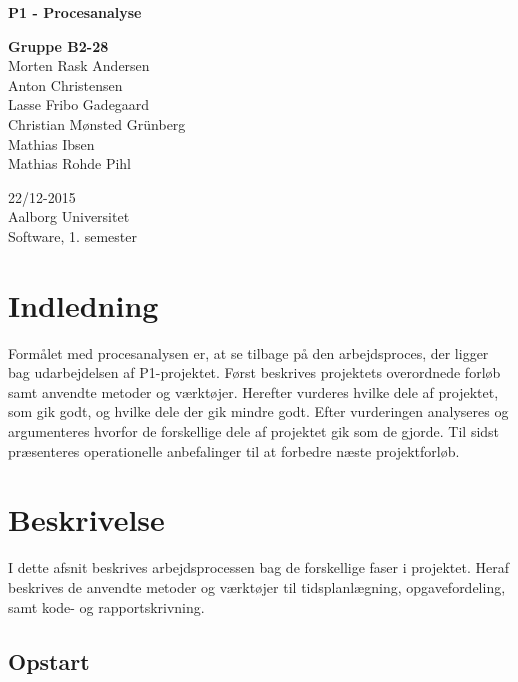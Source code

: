 \documentclass[oneside,a4paper,titlepage]{article}
\begin{document}
\begin{titlepage}
  \vspace{0.2cm}
  \begin{center}
    \Huge{\textbf{P1 - Procesanalyse}}
  \end{center}
  \vspace{0.2cm}
  \begin{center}
    \Large{\textbf{Gruppe B2-28}}\\
    Morten Rask Andersen\\
    Anton Christensen\\
    Lasse Fribo Gadegaard\\
    Christian Mønsted Grünberg\\
    Mathias Ibsen\\
    Mathias Rohde Pihl
  \end{center}
  \begin{center}
    22/12-2015\\
    Aalborg Universitet\\
    Software, 1. semester
  \end{center}
\end{titlepage}


\section{Indledning}

Formålet med procesanalysen er, at se tilbage på den arbejdsproces, der ligger bag udarbejdelsen af P1-projektet. Først beskrives projektets overordnede forløb samt anvendte metoder og værktøjer. Herefter vurderes hvilke dele af projektet, som gik godt, og hvilke dele der gik mindre godt. Efter vurderingen analyseres og argumenteres hvorfor de forskellige dele af projektet gik som de gjorde. Til sidst præsenteres operationelle anbefalinger til at forbedre næste projektforløb. 

\section{Beskrivelse}
\label{sec:beskrivelse}
I dette afsnit beskrives arbejdsprocessen bag de forskellige faser i projektet. Heraf beskrives de anvendte metoder og værktøjer til tidsplanlægning, opgavefordeling, samt kode- og rapportskrivning.

\subsection{Opstart}
\end{document}
